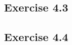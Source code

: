 \documentclass[12pt]{article}
\theoremstyle{plain}
\theoremstyle{nonumberplain}
\theoremstyle{plain}
\theoremstyle{nonumberplain}
\newcommand\1{{\bf 1}}
\newcommand{\<}{\left\langle}
\renewcommand{\>}{\right\rangle}
\begin{document}
\subsection{Exercise 4.3}


\subsection{Exercise 4.4}

\end{document}
